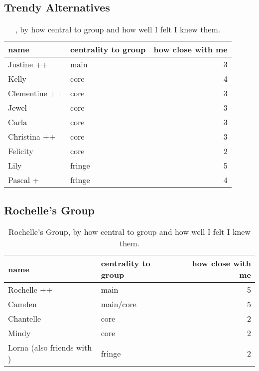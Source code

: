 \subsection{Trendy Alternatives}
\nopagebreak
\begin{table}[ht]
\caption{, by how central to group and how well I felt I knew them.}	\label{append:Alternatives}
	\centering
		\begin{tabular}{llr} \\
		\hline
					name & centrality to group & how close with me  \\
			\hline
Justine ++ & main & 3 \\
Kelly & core & 4 \\
Clementine ++ & core & 3 \\
Jewel  & core & 3 \\
Carla  & core & 3 \\
Christina ++ & core & 3 \\
Felicity & core & 2 \\
Lily  & fringe & 5 \\
Pascal +  & fringe & 4 \\

   \hline
		\end{tabular}
\end{table}

\subsection{Rochelle's Group}
\nopagebreak
\begin{table}[ht]
\caption{Rochelle's Group, by how central to group and how well I felt I knew them.}	\label{append:Drama}
	\centering
		\begin{tabular}{llr} \\
		\hline
							name & centrality to group & how close with me  \\
			\hline
		Rochelle ++ & main & 5 \\
		Camden   & main/core & 5 \\
		Chantelle & core & 2 \\
		Mindy     & core & 2 \\
		Lorna (also friends with \isi{The Relaxed Group})    & fringe & 2 \\
		   \hline
				\end{tabular}
\end{table}


\pagebreak

